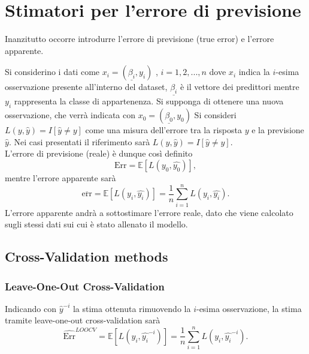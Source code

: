\chapter{Stimatori per l'errore di previsione}
\label{ch:capitolo5}

Inanzitutto occorre introdurre l'errore di previsione (true error) e l'errore apparente.
 


Si considerino i dati come $x_i =  (\underline{\beta_i},y_i)$ , $i = 1,2,...,n$ dove $x_i$ indica la $i$-esima osservazione presente all'interno del dataset, $\underline{\beta_i}$ è il vettore dei predittori mentre $y_i$ rappresenta la classe di appartenenza.
Si supponga di ottenere una nuova osservazione, che verrà indicata con $x_0 =  (\underline{\beta_0},y_0)$
Si consideri ${L(y,\hat{y})}=I[\hat{y} \neq y]$ come una misura dell'errore tra la risposta $y$ e la previsione $\hat{y}$. Nei casi presentati il riferimento sarà ${L(y,\hat{y})}=I[\hat{y} \neq y]$. \\
L'errore di previsione (reale) è dunque così definito
\begin{equation}
\text{Err} = \mathbb{E}[L(y_0, \hat{y_0})],
\end{equation}
mentre l'errore apparente sarà
\begin{equation}
\overline{\text{err}} = \mathbb{E}[L(y_i, \hat{y_i})] = \frac{1}{n} \sum_{i=1}^{n} L(y_i, \hat{y_i}).
\end{equation}
L'errore apparente andrà a sottostimare l'errore reale, dato che viene calcolato sugli stessi dati sui cui è stato allenato il modello.

\section{Cross-Validation methods}
\label{sec:sezione5.1}

\subsection{Leave-One-Out Cross-Validation}
\label{sec:sezione5.1.1}

Indicando con $\hat{y}^{-i}$ la stima ottenuta rimuovendo la $i$-esima osservazione, la stima tramite leave-one-out cross-validation sarà
\begin{equation}
\widehat{\text{Err}}^{LOOCV} = \mathbb{E}[L(y_i, \hat{y_i}^{-i})] = \frac{1}{n} \sum_{i=1}^{n} L(y_i, \hat{y_i}^{-i}).
\end{equation}

